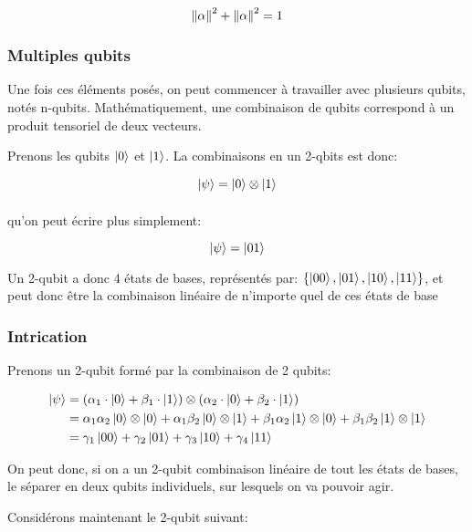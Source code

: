 \begin{equation}
\left\lVert\alpha\right\rVert^2 + \left\lVert\alpha\right\rVert^2 = 1
\end{equation}    

\subsubsection*{Multiples qubits}

Une fois ces éléments posés, on peut commencer à travailler avec plusieurs qubits, notés n-qubits. Mathématiquement, une combinaison de qubits correspond à un produit tensoriel de deux vecteurs.

Prenons les qubits $\ket{0}$ et $\ket{1}$. La combinaisons en un 2-qbits est donc:

\begin{equation}
    \ket{\psi} = \ket{0} \mathbin{\mathop{\otimes}\limits_{}} \ket{1}
\end{equation} 

qu'on peut écrire plus simplement:

\begin{equation}
    \ket{\psi} = \ket{01}
\end{equation}

Un 2-qubit a donc 4 états de bases, représentés par: $\{\ket{00},\ket{01}, \ket{10}, \ket{11} \}$, et peut donc être la combinaison linéaire de n'importe quel de ces états de base

\subsubsection*{Intrication}
Prenons un 2-qubit formé par la combinaison de 2 qubits:

\begin{align*}
\ket{\psi} &= (\alpha_1\cdot\ket{0} + \beta_1\cdot\ket{1}) \otimes (\alpha_2\cdot\ket{0} + \beta_2\cdot\ket{1}) \\
&= \alpha_1\alpha_2 \ket{0} \otimes \ket{0} + \alpha_1\beta_2 \ket{0} \otimes \ket{1} + \beta_1\alpha_2 \ket{1} \otimes \ket{0} + \beta_1\beta_2 \ket{1} \otimes \ket{1} \\
&= \gamma_1 \ket{00} + \gamma_2 \ket{01} + \gamma_3 \ket{10} + \gamma_4 \ket{11}
\end{align*}

On peut donc, si on a un 2-qubit combinaison linéaire de tout les états de bases, le séparer en deux qubits individuels, sur lesquels on va pouvoir agir.

\medbreak

Considérons maintenant le 2-qubit suivant:

